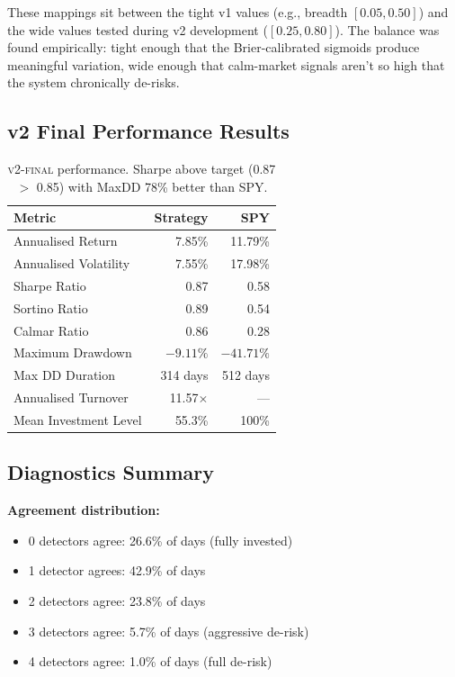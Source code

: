 \documentclass[11pt,a4paper]{article}
\newcommand{\versmark}[1]{\textsc{#1}}
\begin{document}
These mappings sit between the tight v1 values (e.g., breadth $[0.05, 0.50]$) and the wide values tested during v2 development ($[0.25, 0.80]$). The balance was found empirically: tight enough that the Brier-calibrated sigmoids produce meaningful variation, wide enough that calm-market signals aren't so high that the system chronically de-risks.

\subsection{v2 Final Performance Results}

\begin{table}[h]
\centering
\begin{tabular}{lrr}
\toprule
\textbf{Metric} & \textbf{Strategy} & \textbf{SPY} \\
\midrule
Annualised Return & 7.85\% & 11.79\% \\
Annualised Volatility & 7.55\% & 17.98\% \\
Sharpe Ratio & 0.87 & 0.58 \\
Sortino Ratio & 0.89 & 0.54 \\
Calmar Ratio & 0.86 & 0.28 \\
Maximum Drawdown & $-9.11\%$ & $-41.71\%$ \\
Max DD Duration & 314 days & 512 days \\
Annualised Turnover & 11.57$\times$ & --- \\
Mean Investment Level & 55.3\% & 100\% \\
\bottomrule
\end{tabular}
\caption{\versmark{v2-final} performance. Sharpe above target (0.87 $>$ 0.85) with MaxDD 78\% better than SPY.}
\label{tab:v2-perf}
\end{table}

\subsection{Diagnostics Summary}

\textbf{Agreement distribution:}
\begin{itemize}[nosep]
  \item 0 detectors agree: 26.6\% of days (fully invested)
  \item 1 detector agrees: 42.9\% of days
  \item 2 detectors agree: 23.8\% of days
  \item 3 detectors agree: 5.7\% of days (aggressive de-risk)
  \item 4 detectors agree: 1.0\% of days (full de-risk)
\end{itemize}
\end{document}
